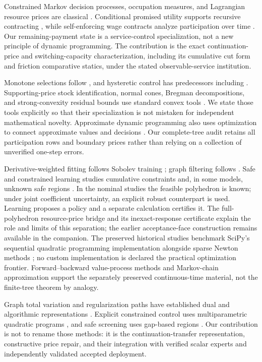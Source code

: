 \documentclass[11pt,letterpaper]{article}
\theoremstyle{definition}
\newcommand{\1}{\mathbf 1}
\begin{document}
Constrained Markov decision processes, occupation measures, and Lagrangian resource prices are classical \citep{Altman1999}. Conditional promised utility supports recursive contracting \citep{SpearSrivastava1987}, while self-enforcing wage contracts analyze participation over time \citep{ThomasWorrall1988}. Our remaining-payment state is a service-control specialization, not a new principle of dynamic programming. The contribution is the exact continuation-price and switching-capacity characterization, including its cumulative cut form and friction comparative statics, under the stated observable-service institution.

Monotone selections follow \citet{Topkis1978}, and hysteretic control has predecessors including \citet{HippHolzbaur1988}. Supporting-price stock identification, normal cones, Bregman decompositions, and strong-convexity residual bounds use standard convex tools \citep{BoydVandenberghe2004}. We state those tools explicitly so that their specialization is not mistaken for independent mathematical novelty. Approximate dynamic programming also uses optimization to connect approximate values and decisions \citep{DeFariasVanRoy2003}. Our complete-tree audit retains all participation rows and boundary prices rather than relying on a collection of unverified one-step errors.

Derivative-weighted fitting follows Sobolev training \citep{Czarnecki2017}; graph filtering follows \citet{Defferrard2016}. Safe and constrained learning studies cumulative constraints and, in some models, unknown safe regions \citep{Satija2020,WachiSui2020}. In the nominal studies the feasible polyhedron is known; under joint coefficient uncertainty, an explicit robust counterpart is used. Learning proposes a policy and a separate calculation certifies it. The full-polyhedron resource-price bridge and its inexact-response certificate explain the role and limits of this separation; the earlier acceptance-face construction remains available in the companion. The preserved historical studies benchmark SciPy's sequential quadratic programming implementation alongside sparse Newton methods \citep{Virtanen2020}; no custom implementation is declared the practical optimization frontier. Forward--backward value-process methods \citep{MaProtterYong1994,HanJentzenE2018} and Markov-chain approximation \citep{KushnerDupuis2001} support the separately preserved continuous-time material, not the finite-tree theorem by analogy.

Graph total variation and regularization paths have established dual and algorithmic representations \citep{TibshiraniTaylor2011,ArnoldTibshirani2016}. Explicit constrained control uses multiparametric quadratic programs \citep{Bemporad2002}, and safe screening uses gap-based regions \citep{Fercoq2015}. Our contribution is not to rename those methods: it is the continuation-transfer representation, constructive price repair, and their integration with verified scalar experts and independently validated accepted deployment.
\end{document}
